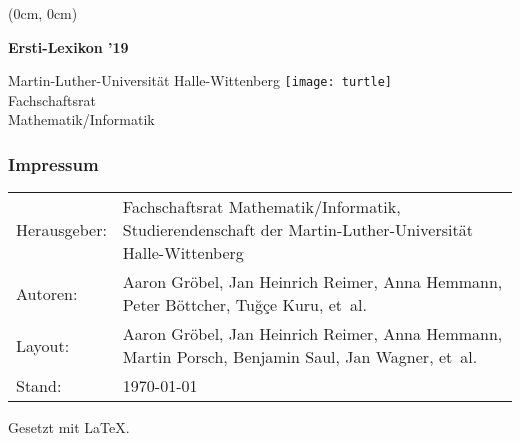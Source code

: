 \thispagestyle{empty}
\pagecolor{coverbackground}
\color{white}
{
    \setlength{\parindent}{0pt}
    \sffamily
    \begin{textblock*}{\textwidth}(0cm, 0cm)%
        \begin{sideways}
            \begin{minipage}{\textheight}
                \fontsize{1.5cm}{1.5cm}\selectfont%
                \bfseries
                \hspace{-0.1em}
                Ersti-Lexikon ’19
                \hfill
            \end{minipage}
        \end{sideways}%
    \end{textblock*}
    {
        \fontsize{0.45cm}{0.45cm}\selectfont
        Martin-Luther-Universität \hfill
        Halle-Wittenberg
    }
    \vfill
    \texttt{[image: turtle]} \\[0.5cm]
    {%
        \fontsize{0.675cm}{0.675cm}\selectfont
        Fachschaftsrat \\[0.5ex]
        Mathematik/Informatik
    }%
}%
\newpage
\restoregeometry
\nopagecolor
\color{black}

\thispagestyle{empty}
\subsubsection{Impressum}
\begin{tabu} to 
    Herausgeber: & Fachschaftsrat Mathematik/Informatik, 
        Studierendenschaft der Martin-Luther-Universität Halle-Wittenberg \\
    Autoren: &
        Aaron Gröbel,
        Jan Heinrich Reimer,
        Anna Hemmann,
        Peter Böttcher,
        Tuğçe Kuru,
        et~al. \\
    Layout: & 
        Aaron Gröbel,
        Jan Heinrich Reimer,
        Anna Hemmann,
        Martin Porsch,
        Benjamin Saul, 
        Jan Wagner, 
        et~al. \\
    Stand: & \today
\end{tabu}
{\scriptsize Gesetzt mit \LaTeX.}
\newpage

